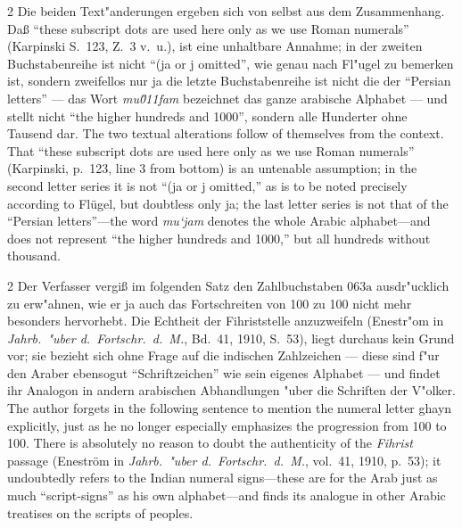 \documentclass[10pt,a4paper]{article}
\renewcommand{\switchcolumn}{\syncronize\nointerlineskip\columnbreak}
\newcommand{\enquote}[1]{``#1''}
\begin{document}
\begin{paracol}{2}
Die beiden Text"anderungen ergeben sich von selbst aus dem Zusammenhang. Da\ss{} \enquote{these subscript dots are used here only as we use Roman numerals} (Karpinski S.\ 123, Z.\ 3 v.\ u.), ist eine unhaltbare Annahme; in der zweiten Buchstabenreihe ist nicht \enquote{(ja or j omitted}, wie genau nach Fl"ugel zu bemerken ist, sondern zweifellos nur ja die letzte Buchstabenreihe ist nicht die der \enquote{Persian letters} --- das Wort \textit{mu\u011fam} bezeichnet das ganze arabische Alphabet --- und stellt nicht \enquote{the higher hundreds and 1000}, sondern alle Hunderter ohne Tausend dar.
\switchcolumn
The two textual alterations follow of themselves from the context. That ``these subscript dots are used here only as we use Roman numerals'' (Karpinski, p.\ 123, line 3 from bottom) is an untenable assumption; in the second letter series it is not ``(ja or j omitted,'' as is to be noted precisely according to Fl\"ugel, but doubtless only ja; the last letter series is not that of the ``Persian letters''---the word \textit{mu`jam} denotes the whole Arabic alphabet---and does not represent ``the higher hundreds and 1000,'' but all hundreds without thousand.
\end{paracol}

\begin{paracol}{2}
Der Verfasser vergi\ss{} im folgenden Satz den Zahlbuchstaben $\text{\u063a}$ ausdr"ucklich zu erw"ahnen, wie er ja auch das Fortschreiten von 100 zu 100 nicht mehr besonders hervorhebt. Die Echtheit der Fihriststelle anzuzweifeln (Enestr"om in \textit{Jahrb.\ "uber d.\ Fortschr.\ d.\ M.}, Bd.\ 41, 1910, S.\ 53), liegt durchaus kein Grund vor; sie bezieht sich ohne Frage auf die indischen Zahlzeichen --- diese sind f"ur den Araber ebensogut \enquote{Schriftzeichen} wie sein eigenes Alphabet --- und findet ihr Analogon in andern arabischen Abhandlungen "uber die Schriften der V"olker.
\switchcolumn
The author forgets in the following sentence to mention the numeral letter ghayn explicitly, just as he no longer especially emphasizes the progression from 100 to 100. There is absolutely no reason to doubt the authenticity of the \textit{Fihrist} passage (Enestr\"om in \textit{Jahrb.\ "uber d.\ Fortschr.\ d.\ M.}, vol.\ 41, 1910, p.\ 53); it undoubtedly refers to the Indian numeral signs---these are for the Arab just as much ``script-signs'' as his own alphabet---and finds its analogue in other Arabic treatises on the scripts of peoples.
\end{paracol}
\clearpage
\end{document}
